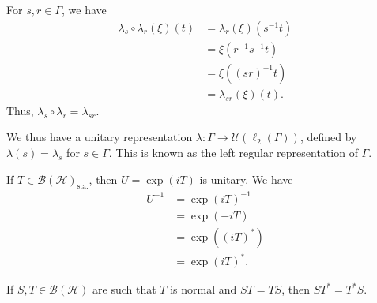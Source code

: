 \documentclass[10pt]{mypackage}
\newcommand{\sa}{\text{s.a.}}
\begin{document}
\begin{example}
  For $s,r\in \Gamma$, we have
  \begin{align*}
    \lambda_s\circ \lambda_r\left(\xi\right)\left(t\right) &= \lambda_r\left(\xi\right)\left(s^{-1}t\right)\\
                                                           &= \xi\left(r^{-1}s^{-1}t\right)\\
                                                           &= \xi\left(\left(sr\right)^{-1}t\right)\\
                                                           &= \lambda_{sr}\left(\xi\right)\left(t\right).
  \end{align*}
  Thus, $\lambda_s\circ \lambda_r = \lambda_{sr}$.\newline

  We thus have a unitary representation $\lambda: \Gamma\rightarrow \mathcal{U}\left(\ell_2\left(\Gamma\right)\right)$, defined by $\lambda(s) = \lambda_s$ for $s\in \Gamma$. This is known as the left regular representation of $\Gamma$.
\end{example}
\begin{example}
  If $T\in \mathcal{B}\left(\mathcal{H}\right)_{\sa}$, then $U = \exp(iT)$ is unitary. We have
  \begin{align*}
    U^{-1} &= \exp\left(iT\right)^{-1}\\
           &= \exp\left(-iT\right)\\
           &= \exp\left(\left(iT\right)^{\ast}\right)\\
           &= \exp\left(iT\right)^{\ast}.
  \end{align*}
\end{example}
\begin{theorem}
  If $S,T\in \mathcal{B}\left(\mathcal{H}\right)$ are such that $T$ is normal and $ST = TS$, then $ST^{\ast} = T^{\ast}S$.
\end{theorem}
\end{document}
